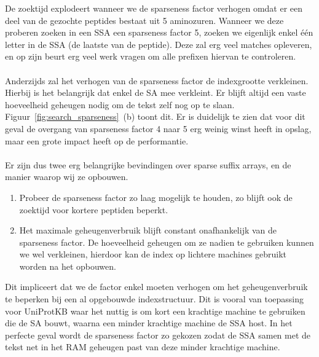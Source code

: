De zoektijd explodeert wanneer we de sparseness factor verhogen omdat er een deel van de gezochte peptides bestaat uit 5 aminozuren.
Wanneer we deze proberen zoeken in een SSA een sparseness factor 5, zoeken we eigenlijk enkel één letter in de SSA (de laatste van de peptide).
Deze zal erg veel matches opleveren, en op zijn beurt erg veel werk vragen om alle prefixen hiervan te controleren.
\\ \\
Anderzijds zal het verhogen van de sparseness factor de indexgrootte verkleinen.
Hierbij is het belangrijk dat enkel de SA mee verkleint.
Er blijft altijd een vaste hoeveelheid geheugen nodig om de tekst zelf nog op te slaan.
Figuur~\ref{fig:search_sparseness}~(b) toont dit.
Er is duidelijk te zien dat voor dit geval de overgang van sparseness factor 4 naar 5 erg weinig winst heeft in opslag, maar een grote impact heeft op de performantie.
\\ \\
Er zijn dus twee erg belangrijke bevindingen over sparse suffix arrays, en de manier waarop wij ze opbouwen.
\begin{enumerate}
    \item Probeer de sparseness factor zo laag mogelijk te houden, zo blijft ook de zoektijd voor kortere peptiden beperkt.
    \item Het maximale geheugenverbruik blijft constant onafhankelijk van de sparseness factor.
    De hoeveelheid geheugen om ze nadien te gebruiken kunnen we wel verkleinen, hierdoor kan de index op lichtere machines gebruikt worden na het opbouwen.
\end{enumerate}

Dit impliceert dat we de factor enkel moeten verhogen om het geheugenverbruik te beperken bij een al opgebouwde indexstructuur.
Dit is vooral van toepassing voor UniProtKB waar het nuttig is om kort een krachtige machine te gebruiken die de SA bouwt, waarna een minder krachtige machine de SSA host.
In het perfecte geval wordt de sparseness factor zo gekozen zodat de SSA samen met de tekst net in het RAM geheugen past van deze minder krachtige machine.

